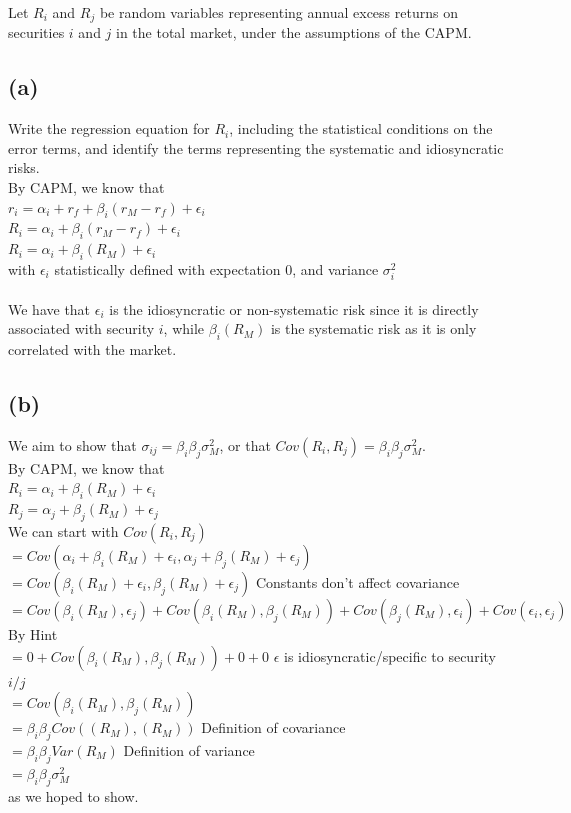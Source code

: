 \documentclass{article}
\begin{document}
{\Large

Let $R_i$ and $R_j$ be random variables representing annual excess returns on securities $i$ and $j$ in the total market, under the assumptions of the CAPM. \\

\subsection*{(a)}

Write the regression equation for $R_i$, including the statistical conditions on the error terms, and identify the terms representing the systematic and idiosyncratic risks. \\

By CAPM, we know that \\
$r_i = \alpha_i + r_f + \beta_i(r_M - r_f) + \epsilon_i$ \\ 
$R_i = \alpha_i + \beta_i (r_M - r_f) + \epsilon_i$ \\
$R_i = \alpha_i + \beta_i (R_M) + \epsilon_i$ \\
with $\epsilon_i$ statistically defined with expectation 0, and variance $\sigma_i^2$ \\ \\
We have that $\epsilon_i$ is the idiosyncratic or non-systematic risk since it is directly associated with security $i$, while $\beta_i (R_M)$ is the systematic risk as it is only correlated with the market.

\subsection*{(b)}

We aim to show that $\sigma_{ij} = \beta_i \beta_j \sigma_M^2$, or that $Cov(R_i, R_j) = \beta_i \beta_j \sigma_M^2$. \\
By CAPM, we know that \\
$R_i = \alpha_i + \beta_i (R_M) + \epsilon_i$ \\
$R_j = \alpha_j + \beta_j (R_M) + \epsilon_j$ \\
We can start with $Cov(R_i, R_j)$ \\ 
$= Cov (\alpha_i + \beta_i (R_M) + \epsilon_i, \alpha_j + \beta_j (R_M) + \epsilon_j)$ \\
$= Cov(\beta_i (R_M) + \epsilon_i, \beta_j (R_M) + \epsilon_j)$ \hfill Constants don't affect covariance \\ 
$= Cov(\beta_i (R_M), \epsilon_j) + Cov(\beta_i (R_M), \beta_j (R_M)) + Cov(\beta_j (R_M), \epsilon_i) + Cov(\epsilon_i, \epsilon_j)$ By Hint \\
$= 0 + Cov(\beta_i (R_M), \beta_j (R_M)) + 0 + 0$ \hfill $\epsilon$ is idiosyncratic/specific to security $i/j$ \\ 
$= Cov(\beta_i (R_M), \beta_j (R_M))$ \\
$= \beta_i \beta_j Cov((R_M), (R_M))$ \hfill Definition of covariance \\
$= \beta_i \beta_j Var(R_M)$ \hfill Definition of variance \\
$= \beta_i \beta_j \sigma^2_M$ \\
as we hoped to show.


}
\end{document}
